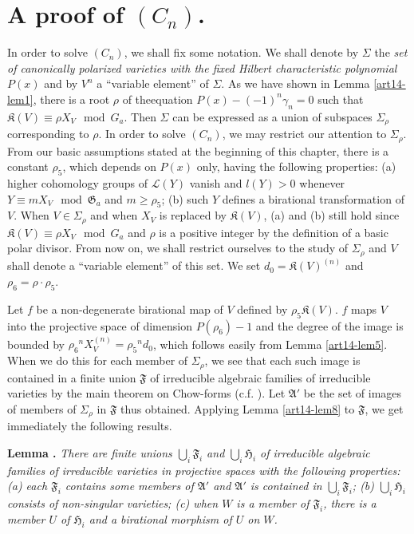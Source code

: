 \section{A proof of \texorpdfstring{$(C_{n})$}{Cn}.}\label{art14-sec9}

In order to solve $(C_{n})$, we shall fix some notation. We shall denote by $\Sigma$ the {\em set of canonically polarized varieties with the fixed Hilbert characteristic polynomial} $P(x)$ and by $V^{n}$ a ``variable element'' of $\Sigma$. As we have shown in Lemma \ref{art14-lem1}, there is a root $\rho$ of the\pageoriginale equation $P(x)-(-1)^{n}\gamma_{n}=0$ such that $\mathfrak{K}(V)\equiv \rho X_{V}\mod G_{a}$. Then $\Sigma$ can be expressed as a union of subspaces $\Sigma_{\rho}$ corresponding to $\rho$. In order to solve $(C_{n})$, we may restrict our attention to $\Sigma_{\rho}$. From our basic assumptions stated at the beginning of this chapter, there is a constant $\rho_{5}$, which depends on $P(x)$ only, having the following properties: (a) higher cohomology groups of $\mathscr{L}(Y)$ vanish and $l(Y)>0$ whenever $Y\equiv mX_{V}\mod \mathfrak{G}_{a}$ and $m\geq \rho_{5}$; (b) such $Y$ defines a birational transformation of $V$. When $V\in \Sigma_{\rho}$ and when $X_{V}$ is replaced by $\mathfrak{K}(V)$, (a) and (b) still hold since $\mathfrak{K}(V)\equiv\rho X_{V}\mod G_{a}$ and $\rho$ is a positive integer by the definition of a basic polar divisor. From now on, we shall restrict ourselves to the study of $\Sigma_{\rho}$ and $V$ shall denote a ``variable element'' of this set. We set $d_{0}=\mathfrak{K}(V)^{(n)}$ and $\rho_{6}=\rho\cdot \rho_{5}$.

Let $f$ be a non-degenerate birational map of $V$ defined by $\rho_{5}\mathfrak{K}(V)$. $f$ maps $V$ into the projective space of dimension $P(\rho_{6})-1$ and the degree of the image is bounded by $\rho_{6}{}^{n}X_{V}^{(n)}=\rho_{5}{}^{n}d_{0}$, which follows easily from Lemma \ref{art14-lem5}. When we do this for each member of $\Sigma_{\rho}$, we see that each such image is contained in a finite union $\mathfrak{F}$ of irreducible algebraic families of irreducible varieties by the main theorem on Chow-forms (c.f. \cite{art14-key3}). Let $\mathfrak{A}'$ be the set of images of members of $\Sigma_{\rho}$ in $\mathfrak{F}$ thus obtained. Applying Lemma \ref{art14-lem8} to $\mathfrak{F}$, we get immediately the following results.

\medskip
\noindent
{\bf Lemma .\label{art14-lem15}}
{\em There are finite unions $\bigcup_{i}\mathfrak{F}_{i}$ and $\bigcup_{i}\mathfrak{H}_{i}$ of irreducible algebraic families of irreducible varieties in projective spaces with the following properties: {\rm(a)} each $\mathfrak{F}_{i}$ contains some members of $\mathfrak{A}'$ and $\mathfrak{A}'$ is contained in $\bigcup_{i}\mathfrak{F}_{i}$; {\rm(b)} $\bigcup_{i}\mathfrak{H}_{i}$ consists of non-singular varieties; {\rm(c)} when $W$ is a member of $\mathfrak{F}_{i}$, there is a member $U$ of $\mathfrak{H}_{i}$ and a birational morphism of $U$ on $W$.}
\smallskip

